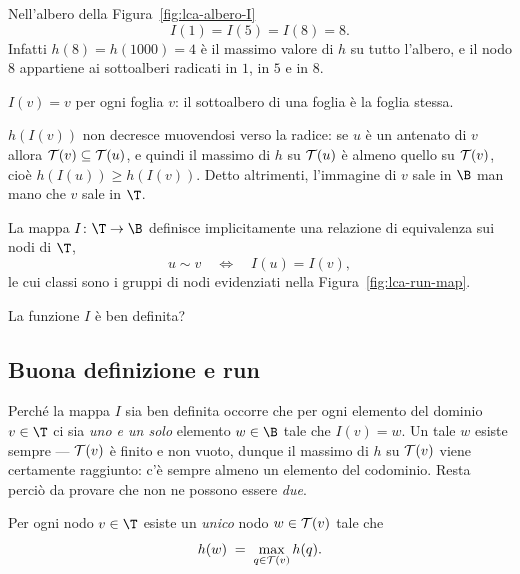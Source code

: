 \begin{esempio}\label{ex:I-esempio}
  Nell'albero della Figura~\ref{fig:lca-albero-I}
  \[
    I(1) = I(5) = I(8) = 8 .
  \]
  Infatti $h(8) = h(1000) = 4$ è il massimo valore di $h$ su tutto l'albero, e il nodo
  $8$ appartiene ai sottoalberi radicati in $1$, in $5$ e in $8$.
\end{esempio}

\begin{osservazione}
  $I(v) = v$ per ogni foglia $v$: il sottoalbero di una foglia è la foglia stessa.
\end{osservazione}

\begin{osservazione}
  $h(I(v))$ non decresce muovendosi verso la radice: se $u$ è un antenato di $v$ allora
  $\mathcal{T}(v) \subseteq \mathcal{T}(u)$, e quindi il massimo di $h$ su $\mathcal{T}(u)$ è
  almeno quello su $\mathcal{T}(v)$, cioè $h(I(u)) \ge h(I(v))$. Detto altrimenti,
  l'immagine di $v$ sale in $\B$ man mano che $v$ sale in $\T$.
\end{osservazione}

La mappa $I \colon \T \to \B$ definisce implicitamente una relazione di equivalenza sui
nodi di $\T$,
\[
  u \sim v \quad\iff\quad I(u) = I(v),
\]
le cui classi sono i gruppi di nodi evidenziati nella
Figura~\ref{fig:lca-run-map}.

\begin{domanda}
  La funzione $I$ è ben definita?
\end{domanda}

\subsection{Buona definizione e run}


Perché la mappa $I$ sia ben definita occorre che per ogni elemento del dominio
$v \in \T$ ci sia \emph{uno e un solo} elemento $w \in \B$ tale che $I(v) = w$. Un tale
$w$ esiste sempre --- $\mathcal{T}(v)$ è finito e non vuoto, dunque il massimo di $h$ su
$\mathcal{T}(v)$ viene certamente raggiunto: c'è sempre almeno un elemento del codominio.
Resta perciò da provare che non ne possono essere \emph{due}.

\begin{proposizione}\label{prop:I-ben-definita}
  Per ogni nodo $v \in \T$ esiste un \emph{unico} nodo $w \in \mathcal{T}(v)$ tale che
  \[
    h(w) \;=\; \max_{q \in \mathcal{T}(v)} h(q).
  \]
\end{proposizione}

